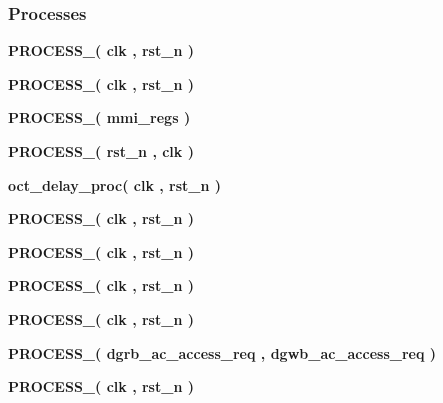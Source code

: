 \subsubsection*{Processes}
 \begin{DoxyCompactItemize}
\item 
{\bf P\+R\+O\+C\+E\+S\+S\+\_}{\bfseries  ( {\bfseries {\bfseries {\bf clk}} \textcolor{vhdlchar}{ }} , {\bfseries {\bfseries {\bf rst\+\_\+n}} \textcolor{vhdlchar}{ }} )}
\item 
{\bf P\+R\+O\+C\+E\+S\+S\+\_}{\bfseries  ( {\bfseries {\bfseries {\bf clk}} \textcolor{vhdlchar}{ }} , {\bfseries {\bfseries {\bf rst\+\_\+n}} \textcolor{vhdlchar}{ }} )}
\item 
{\bf P\+R\+O\+C\+E\+S\+S\+\_}{\bfseries  ( {\bfseries {\bfseries {\bf mmi\+\_\+regs}} \textcolor{vhdlchar}{ }} )}
\item 
{\bf P\+R\+O\+C\+E\+S\+S\+\_}{\bfseries  ( {\bfseries {\bfseries {\bf rst\+\_\+n}} \textcolor{vhdlchar}{ }} , {\bfseries {\bfseries {\bf clk}} \textcolor{vhdlchar}{ }} )}
\item 
{\bf oct\+\_\+delay\+\_\+proc}{\bfseries  ( {\bfseries {\bfseries {\bf clk}} \textcolor{vhdlchar}{ }} , {\bfseries {\bfseries {\bf rst\+\_\+n}} \textcolor{vhdlchar}{ }} )}
\item 
{\bf P\+R\+O\+C\+E\+S\+S\+\_}{\bfseries  ( {\bfseries {\bfseries {\bf clk}} \textcolor{vhdlchar}{ }} , {\bfseries {\bfseries {\bf rst\+\_\+n}} \textcolor{vhdlchar}{ }} )}
\item 
{\bf P\+R\+O\+C\+E\+S\+S\+\_}{\bfseries  ( {\bfseries {\bfseries {\bf clk}} \textcolor{vhdlchar}{ }} , {\bfseries {\bfseries {\bf rst\+\_\+n}} \textcolor{vhdlchar}{ }} )}
\item 
{\bf P\+R\+O\+C\+E\+S\+S\+\_}{\bfseries  ( {\bfseries {\bfseries {\bf clk}} \textcolor{vhdlchar}{ }} , {\bfseries {\bfseries {\bf rst\+\_\+n}} \textcolor{vhdlchar}{ }} )}
\item 
{\bf P\+R\+O\+C\+E\+S\+S\+\_}{\bfseries  ( {\bfseries {\bfseries {\bf clk}} \textcolor{vhdlchar}{ }} , {\bfseries {\bfseries {\bf rst\+\_\+n}} \textcolor{vhdlchar}{ }} )}
\item 
{\bf P\+R\+O\+C\+E\+S\+S\+\_}{\bfseries  ( {\bfseries {\bfseries {\bf dgrb\+\_\+ac\+\_\+access\+\_\+req}} \textcolor{vhdlchar}{ }} , {\bfseries {\bfseries {\bf dgwb\+\_\+ac\+\_\+access\+\_\+req}} \textcolor{vhdlchar}{ }} )}
\item 
{\bf P\+R\+O\+C\+E\+S\+S\+\_}{\bfseries  ( {\bfseries {\bfseries {\bf clk}} \textcolor{vhdlchar}{ }} , {\bfseries {\bfseries {\bf rst\+\_\+n}} \textcolor{vhdlchar}{ }} )}

\end{DoxyCompactItemize}
